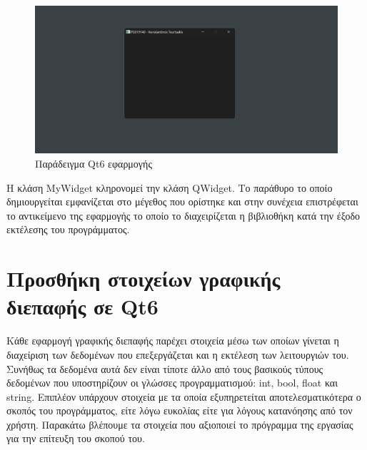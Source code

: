 \begin{figure}[H]
    \centering
    \includegraphics[width=1.0\textwidth]{./images/simple_qt6_app.png}
    \caption{Παράδειγμα Qt6 εφαρμογής}
\end{figure}




Η κλάση MyWidget κληρονομεί την κλάση QWidget. Το παράθυρο το οποίο δημιουργείται
εμφανίζεται στο μέγεθος που ορίστηκε και στην συνέχεια επιστρέφεται το αντικείμενο της εφαρμογής
το οποίο το διαχειρίζεται η βιβλιοθήκη κατά την έξοδο εκτέλεσης του προγράμματος.


\section{Προσθήκη στοιχείων γραφικής διεπαφής σε Qt6}
Κάθε εφαρμογή γραφικής διεπαφής παρέχει στοιχεία μέσω των οποίων γίνεται η διαχείριση
των δεδομένων που επεξεργάζεται και η εκτέλεση των λειτουργιών του. Συνήθως τα δεδομένα αυτά δεν είναι τίποτε άλλο από
τους βασικούς τύπους δεδομένων που υποστηρίζουν οι γλώσσες προγραμματισμού:
int, bool, float και string. Επιπλέον υπάρχουν στοιχεία με τα οποία εξυπηρετείται
αποτελεσματικότερα ο σκοπός του προγράμματος, είτε λόγω ευκολίας είτε για λόγους κατανόησης
από τον χρήστη. Παρακάτω βλέπουμε τα στοιχεία που αξιοποιεί το πρόγραμμα της
εργασίας για την επίτευξη του σκοπού του.

